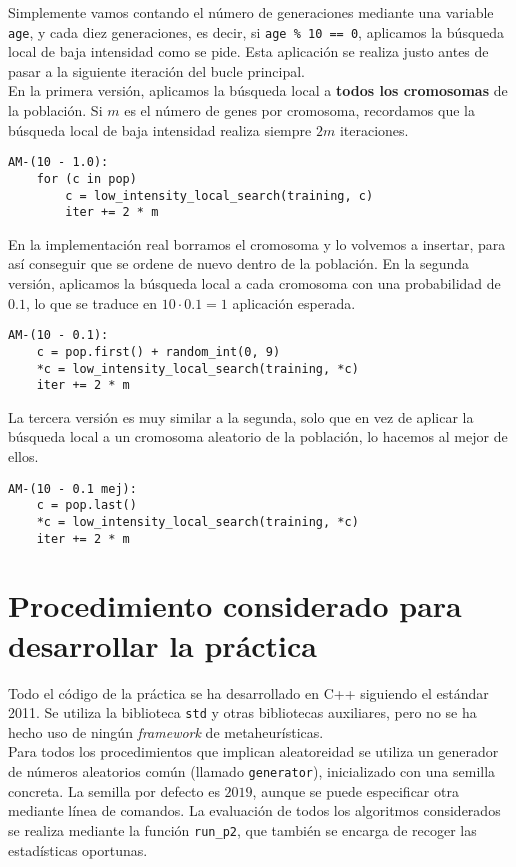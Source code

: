 \documentclass[12pt]{article}
\begin{document}
Simplemente vamos contando el número de generaciones mediante una variable \verb|age|, y cada diez generaciones, es decir, si \verb|age % 10 == 0|, aplicamos la búsqueda local de baja intensidad como se pide. Esta aplicación se realiza justo antes de pasar a la siguiente iteración del bucle principal.\\

En la primera versión, aplicamos la búsqueda local a \textbf{todos los cromosomas} de la población. Si $m$ es el número de genes por cromosoma, recordamos que la búsqueda local de baja intensidad realiza siempre $2m$ iteraciones.

\begin{verbatim}
AM-(10 - 1.0):
    for (c in pop)
        c = low_intensity_local_search(training, c)
        iter += 2 * m
\end{verbatim}

En la implementación real borramos el cromosoma y lo volvemos a insertar, para así conseguir que se ordene de nuevo dentro de la población. En la segunda versión, aplicamos la búsqueda local a cada cromosoma con una probabilidad de $0.1$, lo que se traduce en $10 \cdot 0.1 = 1$ aplicación esperada.

\begin{verbatim}
AM-(10 - 0.1):
    c = pop.first() + random_int(0, 9)
    *c = low_intensity_local_search(training, *c)
    iter += 2 * m
\end{verbatim}

La tercera versión es muy similar a la segunda, solo que en vez de aplicar la búsqueda local a un cromosoma aleatorio de la población, lo hacemos al mejor de ellos.

\begin{verbatim}
AM-(10 - 0.1 mej):
    c = pop.last()
    *c = low_intensity_local_search(training, *c)
    iter += 2 * m
\end{verbatim}

\newpage
\section{Procedimiento considerado para desarrollar la práctica}

Todo el código de la práctica se ha desarrollado en C++ siguiendo el estándar 2011. Se utiliza la biblioteca \verb|std| y otras bibliotecas auxiliares, pero no se ha hecho uso de ningún \textit{framework} de metaheurísticas.\\

Para todos los procedimientos que implican aleatoreidad se utiliza un generador de números aleatorios común (llamado \verb|generator|), inicializado con una semilla concreta. La semilla por defecto es $2019$, aunque se puede especificar otra mediante línea de comandos. La evaluación de todos los algoritmos considerados se realiza mediante la función \verb|run_p2|, que también se encarga de recoger las estadísticas oportunas.\\
\end{document}
